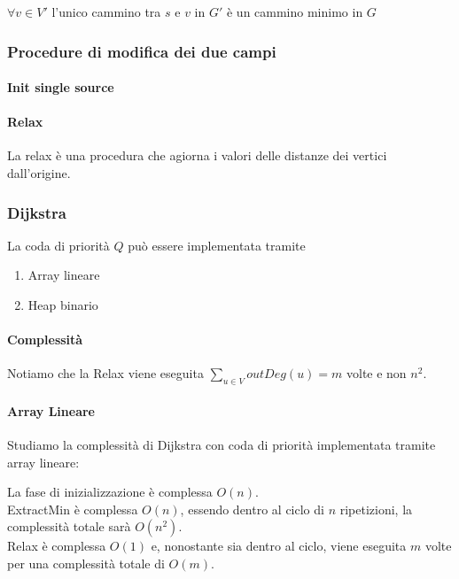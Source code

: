 \documentclass[11pt,a4paper,twoside,openright]{book}
\providecommand{\tightlist}{\setlength{\itemsep}{0pt}\setlength{\parskip}{0pt}}
\let\oldparagraph\paragraph
\renewcommand{\paragraph}[1]{\oldparagraph{#1}\mbox{}}
\begin{document}
{{{$\forall v \in V'$ l'unico cammino tra $s$ e $v$ in $G'$ è un cammino minimo in $G$}

\subsubsection{Procedure di modifica dei due campi}

\paragraph{Init single source}



\paragraph{Relax}

La relax è una procedura che agiorna i valori  delle distanze dei vertici dall'origine.





\subsubsection{Dijkstra}



{La coda di priorità $Q$ può essere implementata tramite}

\begin{enumerate}
\tightlist
\item
  {Array lineare}
\item
  {Heap binario}
\end{enumerate}

\paragraph{Complessità}

Notiamo che la Relax viene eseguita $\sum_{u \in V}{outDeg(u)} = m$ volte e non $n^2$. 

\paragraph{Array Lineare}

{Studiamo la complessità di Dijkstra con coda di priorità implementata tramite array lineare:}

La fase di inizializzazione è complessa $O(n)$. \\
ExtractMin è complessa $O(n)$, essendo dentro al ciclo di $n$ ripetizioni, la complessità totale sarà $O(n^2)$. \\
Relax è complessa $O(1)$ e, nonostante sia dentro al ciclo, viene eseguita $m$ volte per una complessità totale di $O(m)$.

}}
\end{document}
